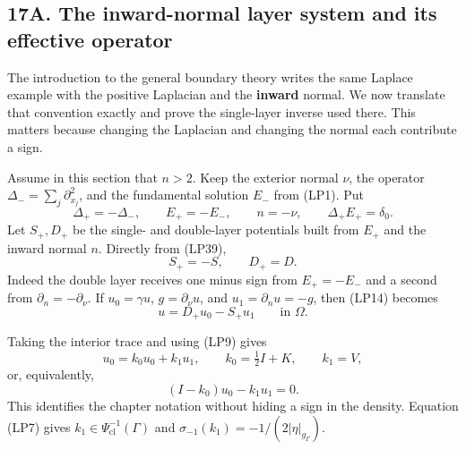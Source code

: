 \documentclass[
  11pt,
]{article}
\makeatletter
\let\ReaderOriginalAnchorStart\hyper@anchorstart
\let\ReaderOriginalAnchorEnd\hyper@anchorend
\let\ReaderPendingAliases\@empty
\def\ReaderArmAliases#1{\gdef\ReaderPendingAliases{#1}}
\def\hyper@anchorstart#1{\ReaderIfNativeAnchorTF{#1}{\ReaderPendingAliases\global\let\ReaderPendingAliases\@empty}{}\ReaderOriginalAnchorStart{#1}}
\makeatother
\begin{document}
\ReaderArmAliases{\ReaderOriginalAnchorStart{AN03-SBD-020}\ReaderOriginalAnchorEnd\begingroup\expandafter\def\csname @currentHref\endcsname{AN03-SBD-020}\label{AN03-SBD-020}\endgroup\ReaderOriginalAnchorStart{an03-sbd-020-inward-normal-layer-system-and-effective-operator}\ReaderOriginalAnchorEnd\begingroup\expandafter\def\csname @currentHref\endcsname{an03-sbd-020-inward-normal-layer-system-and-effective-operator}\label{an03-sbd-020-inward-normal-layer-system-and-effective-operator}\endgroup\ReaderOriginalAnchorStart{17a-the-inward-normal-layer-system-and-its-effective-operator}\ReaderOriginalAnchorEnd\begingroup\expandafter\def\csname @currentHref\endcsname{17a-the-inward-normal-layer-system-and-its-effective-operator}\label{17a-the-inward-normal-layer-system-and-its-effective-operator}\endgroup\ReaderOriginalAnchorStart{a.-the-inward-normal-layer-system-and-its-effective-operator}\ReaderOriginalAnchorEnd}
\subsection{17A. The inward-normal layer system and its effective
operator}\label{a.-the-inward-normal-layer-system-and-its-effective-operator}

The introduction to the general boundary theory writes the same Laplace
example with the positive Laplacian and the \textbf{inward} normal. We
now translate that convention exactly and prove the single-layer inverse
used there. This matters because changing the Laplacian and changing the
normal each contribute a sign.

Assume in this section that \(n>2\). Keep the exterior normal \(\nu\),
the operator \(\Delta_-=\sum_j\partial_{x_j}^2\), and the fundamental
solution \(E_-\) from (LP1). Put \[
 \Delta_+=-\Delta_-,\qquad E_+=-E_-,\qquad n=-\nu,
 \qquad \Delta_+E_+=\delta_0.
 \tag{LP39}
\] Let \(S_+,D_+\) be the single- and double-layer potentials built from
\(E_+\) and the inward normal \(n\). Directly from (LP39), \[
 S_+=-S,\qquad D_+=D.
 \tag{LP40}
\] Indeed the double layer receives one minus sign from \(E_+=-E_-\) and
a second from \(\partial_n=-\partial_\nu\). If \(u_0=\gamma u\),
\(g=\partial_\nu u\), and \(u_1=\partial_nu=-g\), then (LP14) becomes \[
 u=D_+u_0-S_+u_1\qquad\text{in }\Omega.
 \tag{LP41}
\]

Taking the interior trace and using (LP9) gives \[
 u_0=k_0u_0+k_1u_1,\qquad
 k_0=\tfrac12I+K,\qquad k_1=V,
 \tag{LP42}
\] or, equivalently, \[
 (I-k_0)u_0-k_1u_1=0.
 \tag{LP43}
\] This identifies the chapter notation without hiding a sign in the
density. Equation (LP7) gives \(k_1\in\Psi^{-1}_{\mathrm{cl}}(\Gamma)\)
and \(\sigma_{-1}(k_1)=-1/(2|\eta|_{g_\Gamma})\).
\end{document}
